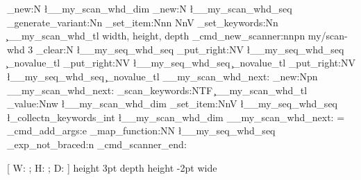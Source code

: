 \documentclass[openany]{book}
\begin{document}
\begin{examcode}{}
\ExplSyntaxOn
\dim_new:N \l__my_scan_whd_dim %
\seq_new:N \l__my_scan_whd_seq %
\cs_generate_variant:Nn \seq_set_item:Nnn { NnV }
\collectn_set_keywords:Nn \c__my_scan_whd_tl { width, height, depth }
\ekeys_cmd_new_scanner:nnpn { my/scan-whd } { 3 }
  {
    \seq_clear:N \l__my_seq_whd_seq
    \seq_put_right:NV \l__my_seq_whd_seq \c_novalue_tl
    \seq_put_right:NV \l__my_seq_whd_seq \c_novalue_tl
    \seq_put_right:NV \l__my_seq_whd_seq \c_novalue_tl
    \__my_scan_whd_next: 
  }
\cs_new:Npn \__my_scan_whd_next: 
  {
    \collectn_scan_keywords:NTF \c__my_scan_whd_tl 
      {
        \collectn_value:Nnw \l__my_scan_whd_dim 
          {
            \seq_set_item:NnV \l__my_seq_whd_seq 
              { \l_collectn_keywords_int } \l__my_scan_whd_dim 
            \__my_scan_whd_next: 
          } = %
      }
      { 
        \ekeys_cmd_add_args:e
          { \seq_map_function:NN \l__my_seq_whd_seq \ekeys_exp_not_braced:n }
        \ekeys_cmd_scanner_end: 
      }
  }
\ExplSyntaxOff

\DeclareEKeysCommand {} 
  {[ W: ; H: ; D:  ]}
\ttfamily
\foo height 3pt depth \dimeval{3pt+2pt-10pt} height \dimexpr 3pt-2pt wide
\end{examcode}
\end{document}
